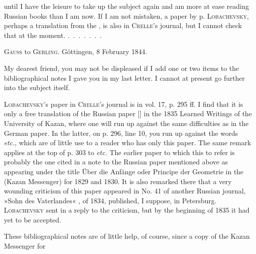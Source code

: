 %
until I have the leisure to take up the subject again and am more at ease reading Russian books than I am now. If I am not mistaken, a paper by p. \textsc{Lobachevsky}, perhaps a translation from the , is also in \textsc{Crelle}'s journal, but I cannot check that at the moment. \mbox{.\ .\ .\ .\ .\ .\ .}

\par\bigskip{}

\begin{center}\textsc{Gauss} to \textsc{Gerling}. Göttingen, 8 February 1844.\end{center}

My dearest friend, you may not be displeased if I add one or two items to the bibliographical notes I gave you in my last letter. I cannot at present go further into the subject itself.

\textsc{Lobachevsky}'s paper in \textsc{Crelle}'s journal is in vol. 17, p. 295 ff. I find that it is only a free translation of the Russian paper [] in the 1835 Learned Writings of the University of Kazan, where one will run up against the same difficulties as in the German paper. In the latter, on p. 296, line 10, you run up against the words  \emph{etc.}, which are of little use to a reader who has only this paper. The same remark applies at the top of p. 303 to  \emph{etc.} The earlier paper to which this  to refer is probably the one cited in a note to the Russian paper mentioned above as appearing under the title Über die Anfänge oder Principe der Geometrie in the  (Kazan Messenger) for 1829 and 1830. It is also remarked there that a very wounding criticism of this paper appeared in No. 41 of another Russian journal, »Sohn des Vaterlandes« , of 1834, published, I suppose, in Petersburg. \textsc{Lobachevsky} sent in a reply to the criticism, but by the beginning of 1835 it had yet to be accepted.

These bibliographical notes are of little help, of course, since a copy of the Kazan Messenger for\space%
